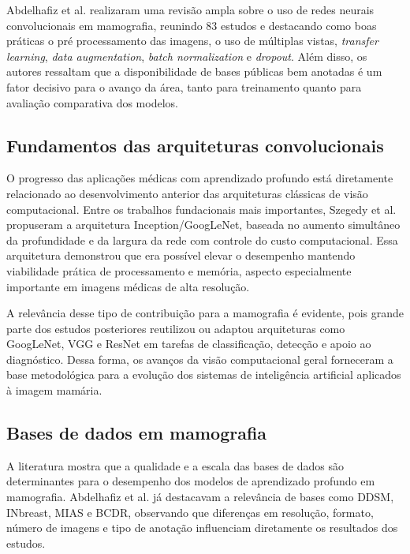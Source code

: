 Abdelhafiz et al. \cite{abdelhafiz2019} realizaram uma revisão ampla sobre o uso de redes neurais convolucionais em mamografia, reunindo 83 estudos e destacando como boas práticas o pré processamento das imagens, o uso de múltiplas vistas, \textit{transfer learning}, \textit{data augmentation}, \textit{batch normalization} e \textit{dropout}. Além disso, os autores ressaltam que a disponibilidade de bases públicas bem anotadas é um fator decisivo para o avanço da área, tanto para treinamento quanto para avaliação comparativa dos modelos.

\subsection{Fundamentos das arquiteturas convolucionais}

O progresso das aplicações médicas com aprendizado profundo está diretamente relacionado ao desenvolvimento anterior das arquiteturas clássicas de visão computacional. Entre os trabalhos fundacionais mais importantes, Szegedy et al. \cite{szegedy2014} propuseram a arquitetura Inception/GoogLeNet, baseada no aumento simultâneo da profundidade e da largura da rede com controle do custo computacional. Essa arquitetura demonstrou que era possível elevar o desempenho mantendo viabilidade prática de processamento e memória, aspecto especialmente importante em imagens médicas de alta resolução.

A relevância desse tipo de contribuição para a mamografia é evidente, pois grande parte dos estudos posteriores reutilizou ou adaptou arquiteturas como GoogLeNet, VGG e ResNet em tarefas de classificação, detecção e apoio ao diagnóstico. Dessa forma, os avanços da visão computacional geral forneceram a base metodológica para a evolução dos sistemas de inteligência artificial aplicados à imagem mamária.

\subsection{Bases de dados em mamografia}

A literatura mostra que a qualidade e a escala das bases de dados são determinantes para o desempenho dos modelos de aprendizado profundo em mamografia. Abdelhafiz et al. \cite{abdelhafiz2019} já destacavam a relevância de bases como DDSM, INbreast, MIAS e BCDR, observando que diferenças em resolução, formato, número de imagens e tipo de anotação influenciam diretamente os resultados dos estudos.


